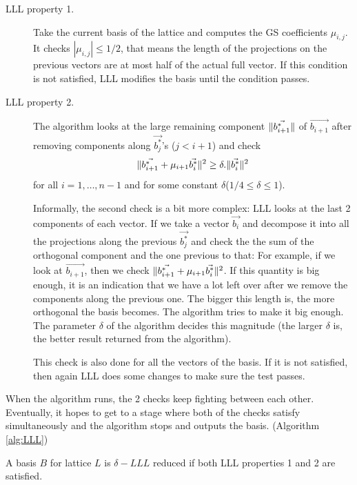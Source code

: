 \begin{description}
\item [LLL property 1.] Take the current basis of the lattice and computes the
  GS coefficients $\mu_{i,j}$. It checks $|\mu_{i,j}| \leq 1/2$, that means the
  length of the projections on the previous vectors are at most half of the
  actual full vector. If this condition is not satisfied, LLL modifies the basis
  until the condition passes.
\item [LLL property 2.] The algorithm looks at the large remaining component
  $\Vert \vec{b_{i+1}^*} \Vert$ of $\vec{b_{i+1}}$ after removing components along
  $\vec{b_j^*}$'s ($j < i + 1$) and check
  \[
    \Vert \vec{b_{i+1}^*}+\mu_{i+1}\vec{b_i^*} \Vert^2 \geq \delta
    . \Vert \vec{b_i^*} \Vert^2
  \]
  for all $i=1,\dots,n-1$ and for some constant
  $\delta$($1/4 \leq \delta \leq 1$).

  Informally, the second check is a bit more complex: LLL looks at the last 2
  components of each vector. If we take a vector $\vec{b_i}$ and decompose it
  into all the projections along the previous $\vec{b_j^*}$ and check the the
  sum of the orthogonal component and the one previous to that: For example, if
  we look at $\vec{b_{i+1}}$, then we check
  $\Vert \vec{b_{i+1}^*}+\mu_{i+1}\vec{b_i^*} \Vert^2$. If this quantity is big
  enough, it is an indication that we have a lot left over after we remove the
  components along the previous one. The bigger this length is, the more
  orthogonal the basis becomes. The algorithm tries to make it big enough.  The
  parameter $\delta$ of the algorithm decides this magnitude (the larger
  $\delta$ is, the better result returned from the algorithm).

  This check is also done for all the vectors of the basis. If it is not
  satisfied, then again LLL does some changes to make sure the test passes.
\end{description}

When the algorithm runs, the 2 checks keep fighting between each
other. Eventually, it hopes to get to a stage where both of the checks satisfy
simultaneously and the algorithm stops and outputs the basis. (Algorithm
\ref{alg:LLL})
\begin{definition}
  A basis $B$ for lattice $L$ is $\delta-LLL$ reduced if both LLL properties 1
  and 2 are satisfied.
  \label{def:LLL}
\end{definition}

